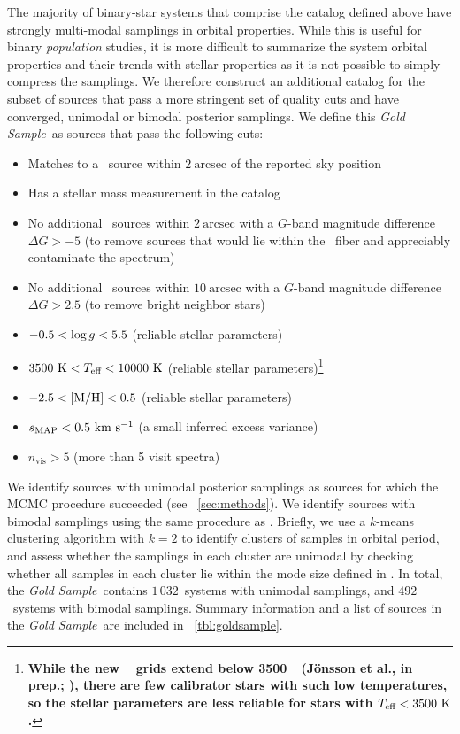 \documentclass[modern]{aastex63}
\newcommand{\changes}[1]{{\bf\color{purple}#1}}
\newcommand{\goldsample}{\textit{Gold Sample}}
\newcommand{\ngold}{\ensuremath{1\,032}}
\newcommand{\nbimodal}{\ensuremath{492}}
\begin{document}
The majority of binary-star systems that comprise the catalog defined above have
strongly multi-modal samplings in orbital properties.
While this is useful for binary \textit{population} studies, it is more
difficult to summarize the system orbital properties and their trends with
stellar properties as it is not possible to simply compress the samplings.
We therefore construct an additional catalog for the subset of sources that pass
a more stringent set of quality cuts and have converged, unimodal or bimodal
posterior samplings.
We define this \goldsample\ as sources that pass the following cuts:
\begin{itemize}
    \item Matches to a \gaia\ source within $2~\textrm{arcsec}$ of the
          reported  sky position
    \item Has a stellar mass measurement in the  catalog
          \citep{Queiroz:2019}
    \item No additional \gaia\ sources within $2~\textrm{arcsec}$ with a
          $G$-band magnitude difference $\Delta G > -5$ (to remove sources that
          would lie within the \apogee\ fiber and appreciably contaminate the
          spectrum)
    \item No additional \gaia\ sources within $10~\textrm{arcsec}$ with a
          $G$-band magnitude difference $\Delta G > 2.5$ (to remove bright
          neighbor stars)
    \item $-0.5 < \log g < 5.5$ (reliable stellar parameters)
    \item $3500~\mathrm{K} < T_{\textrm{eff}} < 10000~\mathrm{K}$ (reliable stellar parameters)\footnote{\changes{While the new \apogee\  grids extend below 3500~\Kel\ (J\"onsson et al., in prep.; \citealt{DR16}), there are few calibrator stars with such low temperatures, so the stellar parameters are less reliable for stars with $T_{\textrm{eff}} < 3500~\mathrm{K}$.}}
    \item $-2.5 < {[{\rm M}/{\rm H}]} < 0.5$ (reliable stellar parameters)
    \item $s_{\textrm{MAP}} < 0.5~\mathrm{km}~\mathrm{s}^{-1}$ (a small inferred excess variance)
    \item $n_{\textrm{vis}} > 5$ (more than 5 visit spectra)
\end{itemize}

We identify sources with unimodal posterior samplings as sources for which the
MCMC procedure succeeded (see \sectionname~\ref{sec:methods}).
We identify sources with bimodal samplings using the same procedure as
\cite{Price-Whelan:2018}.
Briefly, we use a $k$-means clustering algorithm with $k=2$ to identify clusters
of samples in orbital period, and assess whether the samplings in each cluster
are unimodal by checking whether all samples in each cluster lie within the mode
size defined in \cite{thejoker}.
In total, the \goldsample\ contains \ngold\ systems with unimodal samplings, and
\nbimodal\ systems with bimodal samplings.
Summary information and a list of sources in the \goldsample\ are included in
\tablename~\ref{tbl:goldsample}.
\end{document}
